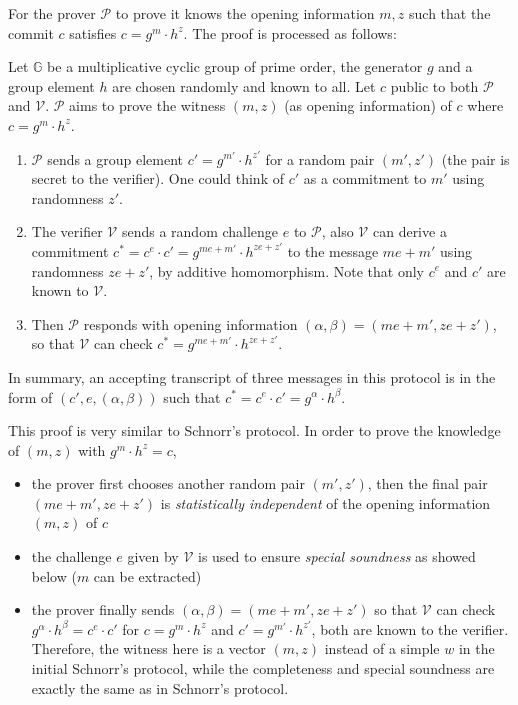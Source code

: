 \documentclass{article}
\begin{document}
For the prover $\mathcal{P}$ to prove it knows the opening information $m, z$ such that the commit $c$ satisfies $c = g^m \cdot h^z$. The proof is processed as follows: 
\begin{boxx1} \label{def:zk-opening-pedersen}
Let $\mathbb{G}$ be a multiplicative cyclic group of prime order, the generator $g$ and a group element $h$ are chosen randomly and known to all. Let $c$ public to both $\mathcal{P}$ and $\mathcal{V}$. $\mathcal{P}$ aims to prove the witness $(m, z)$ (as opening information) of $c$ where $c = g^m \cdot h^z$.
\begin{enumerate}
\item\label{item:42} $\mathcal{P}$ sends a group element $c' = g^{m'} \cdot h^{z'}$ for a random pair $(m', z')$ (the pair is secret to the verifier). One could think of $c'$ as a commitment to $m'$ using randomness $z'$. 
\item\label{item:43} The verifier $\mathcal{V}$ sends a random challenge $e$ to $\mathcal{P}$, also $\mathcal{V}$ can derive a commitment $c^{\displaystyle *} = c^e \cdot c' = g^{me + m'} \cdot h^{ze + z'}$ to the message $me + m'$ using randomness $ze + z'$, by additive homomorphism. Note that only $c^e$ and $c'$ are known to $\mathcal{V}$.
\item\label{item:44} Then $\mathcal{P}$ responds with opening information $(\alpha, \beta) = (me + m', ze + z')$, so that $\mathcal{V}$ can check $c^{\displaystyle *} = g^{me + m'} \cdot h^{ze + z'}$.
\end{enumerate}
In summary, an accepting transcript of three messages in this protocol is in the form of $(c', e, (\alpha, \beta))$ such that $c^{\displaystyle *} = c^e \cdot c' = g^{\alpha} \cdot h^{\beta}$.
\end{boxx1}

\begin{remark}
This proof is very similar to Schnorr's protocol. In order to prove the knowledge of $(m, z)$ with $g^m \cdot h^z = c$,
\begin{itemize}
\item the prover first chooses another random pair $(m', z')$, then the final pair $(me + m', ze + z')$ is \textit{statistically independent} of the opening information $(m, z)$ of $c$ 
\item the challenge $e$ given by $\mathcal{V}$ is used to ensure \textit{special soundness} as showed below ($m$ can be extracted)
\item the prover finally sends $(\alpha, \beta) = (me + m', ze + z')$ so that $\mathcal{V}$ can check $g^{\alpha} \cdot h^{\beta} = c^e \cdot c'$ for $c = g^m \cdot h^z$ and $c' = g^{m'} \cdot h^{z'}$, both are known to the verifier. Therefore, the witness here is a vector $(m, z)$ instead of a simple $w$ in the initial Schnorr's protocol, while the completeness and special soundness are exactly the same as in Schnorr's protocol. 
\end{itemize}
\end{remark}
\end{document}
